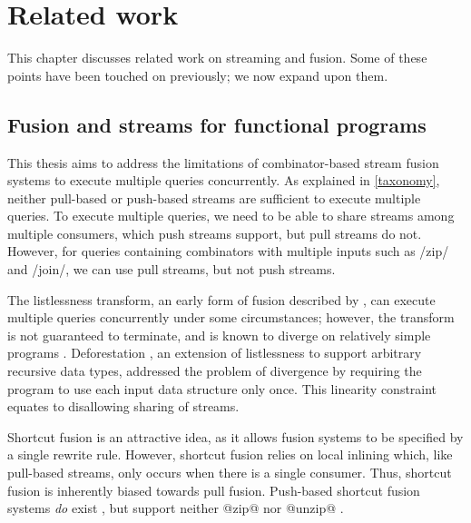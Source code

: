 \chapter{Related work}
\label{related}

This chapter discusses related work on streaming and fusion.
Some of these points have been touched on previously; we now expand upon them.

\section{Fusion and streams for functional programs}
\label{related/fusion}
\label{related/stream-fusion}

This thesis aims to address the limitations of combinator-based stream fusion systems to execute multiple queries concurrently.
As explained in \cref{taxonomy}, neither pull-based or push-based streams are sufficient to execute multiple queries.
To execute multiple queries, we need to be able to share streams among multiple consumers, which push streams support, but pull streams do not.
However, for queries containing combinators with multiple inputs such as \Hs/zip/ and \Hs/join/, we can use pull streams, but not push streams.

The listlessness transform, an early form of fusion described by \citet{wadler1984listlessness}, can execute multiple queries concurrently under some circumstances; however, the transform is not guaranteed to terminate, and is known to diverge on relatively simple programs \citep{caspi1996synchronous}.
Deforestation \citep{wadler1990deforestation}, an extension of listlessness to support arbitrary recursive data types, addressed the problem of divergence by requiring the program to use each input data structure only once.
This linearity constraint equates to disallowing sharing of streams.

Shortcut fusion is an attractive idea, as it allows fusion systems to be specified by a single rewrite rule.
However, shortcut fusion relies on local inlining which, like pull-based streams, only occurs when there is a single consumer.
Thus, shortcut fusion is inherently biased towards pull fusion.
Push-based shortcut fusion systems \emph{do} exist \cite{gill1993short}, but support neither @zip@ nor @unzip@ \cite{svenningsson2002shortcut,lippmeier2013data}.

